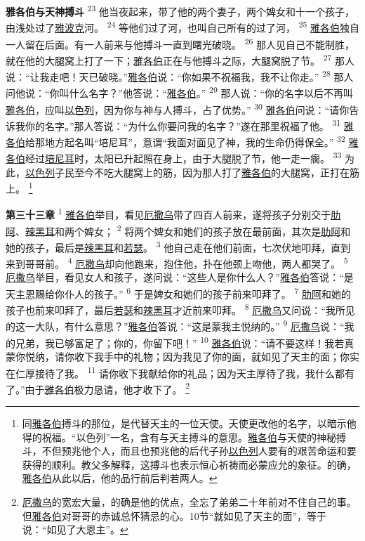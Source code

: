 \textbf{雅各伯与天神搏斗\quad}
\textsuperscript{23}
他当夜起来，带了他的两个妻子，两个婢女和十一个孩子，由浅处过了\uline{雅波克}河。
\textsuperscript{24}
等他们过了河，也叫自己所有的过了河，
\textsuperscript{25}
\uline{雅各伯}独自一人留在后面。有一人前来与他搏斗一直到曙光破晓。
\textsuperscript{26}
那人见自己不能制胜，就在他的大腿窝上打了一下；\uline{雅各伯}正在与他搏斗之际，大腿窝脱了节。
\textsuperscript{27}
那人说：“让我走吧！天已破晓。”\uline{雅各伯}说：“你如果不祝福我，我不让你走。”
\textsuperscript{28}
那人问他说：“你叫什么名字？”他答说：“\uline{雅各伯}。”
\textsuperscript{29}
那人说：“你的名字以后不再叫\uline{雅各伯}，应叫\uline{以色列}，因为你与神与人搏斗，占了优势。”
\textsuperscript{30}
\uline{雅各伯}问说：“请你告诉我你的名字。”那人答说：“为什么你要问我的名字？”遂在那里祝福了他。
\textsuperscript{31}
\uline{雅各伯}给那地方起名叫“培尼耳”，意谓“我面对面见了神，我的生命仍得保全。”
\textsuperscript{32}
\uline{雅各伯}经过\uline{培尼耳}时，太阳已升起照在身上，由于大腿脱了节，他一走一瘸。
\textsuperscript{33}
为此，\uline{以色列}子民至今不吃大腿窝上的筋，因为那人打了\uline{雅各伯}的大腿窝，正打在筋上。
\footnote{同\uline{雅各伯}搏斗的那位，是代替天主的一位天使。天使更改他的名字，以暗示他得的祝福。“以色列”一名，含有与天主搏斗的意思。\uline{雅各伯}与天使的神秘搏斗，不但预兆他个人，而且也预兆他的后代子孙\uline{以色列}人要有的艰苦命运和要获得的顺利。教父多解释，这搏斗也表示恒心祈祷而必蒙应允的象征。的确，\uline{雅各伯}从此以后，他的品行前后判若两人。}

\textbf{第三十三章\quad}
\textsuperscript{1}
\uline{雅各伯}举目，看见\uline{厄撒乌}带了四百人前来，遂将孩子分别交于\uline{肋阿}、\uline{辣黑耳}和两个婢女；
\textsuperscript{2}
将两个婢女和她们的孩子放在最前面，其次是\uline{肋阿}和她的孩子，最后是\uline{辣黑耳}和\uline{若瑟}。
\textsuperscript{3}
他自己走在他们前面，七次伏地叩拜，直到来到哥哥前。
\textsuperscript{4}
\uline{厄撒乌}却向他跑来，抱住他，扑在他颈上吻他，两人都哭了。
\textsuperscript{5}
\uline{厄撒乌}举目，看见女人和孩子，遂问说：“这些人是你什么人？”\uline{雅各伯}答说：“是天主恩赐给你仆人的孩子。”
\textsuperscript{6}
于是婢女和她们的孩子前来叩拜了。
\textsuperscript{7}
\uline{肋阿}和她的孩子也前来叩拜了，最后\uline{若瑟}和\uline{辣黑耳}才近前来叩拜。
\textsuperscript{8}
\uline{厄撒乌}又问说：“我所见的这一大队，有什么意思？”\uline{雅各伯}答说：“这是蒙我主悦纳的。”
\textsuperscript{9}
\uline{厄撒乌}说：“我的兄弟，我已够富足了；你的，你留下吧！”
\textsuperscript{10}
\uline{雅各伯}说：“请不要这样！我若真蒙你悦纳，请你收下我手中的礼物；因为我见了你的面，就如见了天主的面；你实在仁厚接待了我。
\textsuperscript{11}
请你收下我献给你的礼品；因为天主厚待了我，我什么都有了。”由于\uline{雅各伯}极力恳请，他才收下了。
\footnote{\uline{厄撒乌}的宽宏大量，的确是他的优点，全忘了弟弟二十年前对不住自己的事。但\uline{雅各伯}对哥哥的赤诚总怀猜忌的心。10节“就如见了天主的面”，等于说：“如见了大恩主”。}

